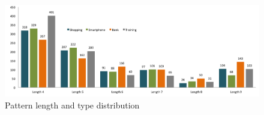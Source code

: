 {{    %
    \begin{figure}[H]
      \centering
      \includegraphics[width=\textwidth]{pics/analysis/patterntypePatternLength.png}
      \caption{Pattern length and type distribution}
      \label{fig:patternTypePatternLength}
    \end{figure}

}}
